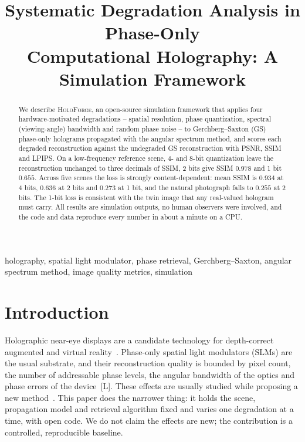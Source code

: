 \documentclass[conference]{IEEEtran}
\title{Systematic Degradation Analysis in Phase-Only\\Computational Holography: A Simulation Framework}
\author{
  \IEEEauthorblockN{Chaitanya Tripathi}
  \IEEEauthorblockA{Ashoka University\\
  Sonipat, India\\
  chaitanya.tripathi\_ug2025@ashoka.edu.in}
}
\begin{document}
\maketitle

\begin{abstract}
We describe \textsc{HoloForge}, an open-source simulation framework that
applies four hardware-motivated degradations -- spatial resolution, phase
quantization, spectral (viewing-angle) bandwidth and random phase noise -- to
Gerchberg--Saxton (GS) phase-only holograms propagated with the angular
spectrum method, and scores each degraded reconstruction against the
undegraded GS reconstruction with PSNR, SSIM and LPIPS. On a low-frequency
reference scene, 4- and 8-bit quantization leave the reconstruction
unchanged to three decimals of SSIM, 2 bits give SSIM $0.978$ and 1 bit
$0.655$. Across five scenes the loss is strongly content-dependent: mean
SSIM is $0.934$ at 4 bits, $0.636$ at 2 bits and $0.273$ at 1 bit, and the
natural photograph falls to $0.255$ at 2 bits. The 1-bit loss is consistent
with the twin image that any real-valued hologram must carry. All results are
simulation outputs, no human observers were involved, and the code and data
reproduce every number in about a minute on a CPU.
\end{abstract}

\begin{IEEEkeywords}
holography, spatial light modulator, phase retrieval, Gerchberg--Saxton,
angular spectrum method, image quality metrics, simulation
\end{IEEEkeywords}

\section{Introduction}
Holographic near-eye displays are a candidate technology for
depth-correct augmented and virtual reality~\cite{maimone2017holographic,shi2021towards}.
Phase-only spatial light modulators (SLMs) are the usual substrate, and their
reconstruction quality is bounded by pixel count, the number of addressable
phase levels, the angular bandwidth of the optics and phase errors of the
device~[L]. These effects are usually studied while proposing a new
method~\cite{choi2022time,peng2020neural,chakravarthula2019wirtinger,shi2021towards}.
This paper does the narrower thing: it holds the scene, propagation model and
retrieval algorithm fixed and varies one degradation at a time, with open
code. We do not claim the effects are new; the contribution is a controlled,
reproducible baseline.
\end{document}

